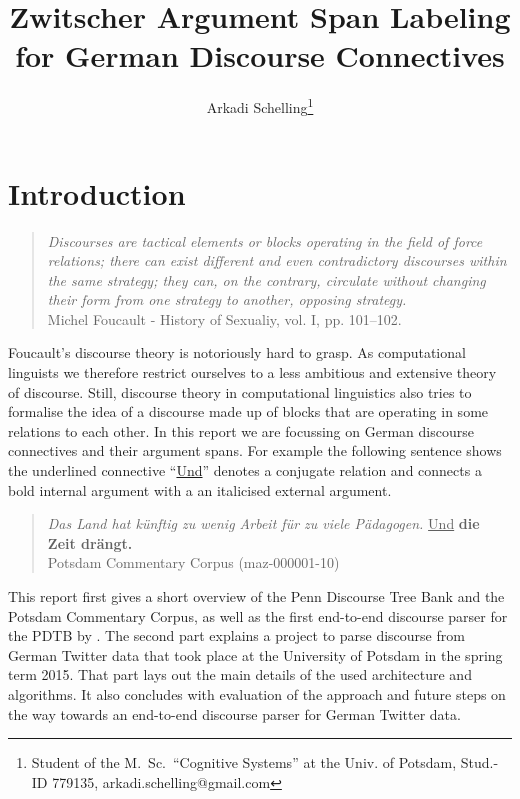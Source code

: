 \documentclass[10pt,a4paper]{article}
\author{Arkadi Schelling\footnote{Student of the M.~Sc.~``Cognitive Systems'' at the Univ. of Potsdam, Stud.-ID 779135, arkadi.schelling@gmail.com}}
\title{Zwitscher\linebreak
	\normalsize Argument Span Labeling for German Discourse Connectives}
\begin{document}
\lstset{basicstyle=\footnotesize, breaklines=true, language=Python} %
\maketitle
\hfill
\tableofcontents %
\pagebreak

\section{Introduction}

\begin{quote}
\textit{Discourses are tactical elements or blocks operating in the field of force relations; there can exist different and even contradictory discourses within the same strategy; they can, on the contrary, circulate without changing their form from one strategy to another, opposing strategy.}\\
\quad Michel Foucault - History of Sexualiy, vol. I, pp. 101--102.
\end{quote}

Foucault's discourse theory is notoriously hard to grasp. As computational linguists we therefore restrict ourselves to a less ambitious and extensive theory of discourse. Still, discourse theory in computational linguistics also tries to formalise the idea of a discourse made up of blocks that are operating in some relations to each other. In this report we are focussing on German discourse connectives and their argument spans. For example the following sentence shows the underlined connective ``\underline{Und}'' denotes a conjugate relation and connects a bold internal argument with a an italicised external argument.

\begin{quote}\label{PCCquote}
\textit{Das Land hat künftig zu wenig Arbeit für zu viele Pädagogen.} \underline{Und} \textbf{die Zeit drängt.}\\
\quad Potsdam Commentary Corpus (maz-000001-10)
\end{quote}

This report first gives a short overview of the Penn Discourse Tree Bank and the Potsdam Commentary Corpus, as well as the first end-to-end discourse parser for the PDTB by \cite{Lin12}.
The second part explains a project to parse discourse from German Twitter data that took place at the University of Potsdam in the spring term 2015. That part lays out the main details of the used architecture and algorithms. It also concludes with evaluation of the approach and future steps on the way towards an end-to-end discourse parser for German Twitter data.
\end{document}
